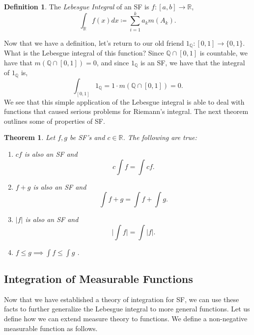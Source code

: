 \documentclass{article}
\newtheorem{theorem}{Theorem}
\theoremstyle{axiom} \newtheorem{axiom}{Axiom}
\theoremstyle{definition} \newtheorem{definition}{Definition}
\theoremstyle{example} \newtheorem{example}{Example}
\theoremstyle{proposition} \newtheorem{prop}{Proposition}
\theoremstyle{lemma} \newtheorem{lemma}{Lemma}
\newcommand{\Q}{\mathbb{Q}}  \newcommand{\R}{\mathbb{R}}
\begin{document}
\begin{definition}
	The \textit{Lebesgue Integral} of an SF is $f:[a,b] \rightarrow \R$,
	\begin{equation}
		\int_{\R} f(x) dx \coloneqq \sum_{i=1}^k a_k m(A_k).
	\end{equation}
\end{definition}
Now that we have a definition, let's return to our old friend 
$1_{\Q}:[0,1] \rightarrow \{0,1\}$. What is the Lebesgue integral of this
function? Since $\Q\cap [0,1]$ is countable, we have that $m(\Q\cap [0,1]) = 0$, and since 
$1_{\Q}$ is an SF, we have that the integral of $1_{\Q}$ is,
\begin{equation*}
	\int_{[0,1]} 1_{\Q} = 1\cdot m(\Q\cap [0,1]) = 0.
\end{equation*}
We see that this simple application of the Lebesgue integral is able to deal
with functions that caused serious problems for Riemann's integral. The next
theorem outlines some of properties of SF.
\begin{theorem}
	Let $f,g$ be SF's and $c \in \R$. The following are true:
	\begin{enumerate}
	\item $cf$ is also an SF and
		\begin{equation}
			c\int f= \int cf.
		\end{equation}
	\item $f+g$ is also an SF and
		\begin{equation}
			\int f+g = \int f + \int g.
		\end{equation}
	\item $|f|$ is also an SF and
		\begin{equation}
			\bigg| \int f\bigg| = \int |f|.
		\end{equation}
	\item $f \leq g \implies \int f \leq \int g$ .
	\end{enumerate}
\end{theorem}

\subsection{Integration of Measurable Functions}

Now that we have established a theory of integration for SF, we can use these
facts to further generalize the Lebesgue integral to more general functions. 
Let us define how we can extend measure theory to functions. We define a 
non-negative measurable function as follows. 
\end{document}
